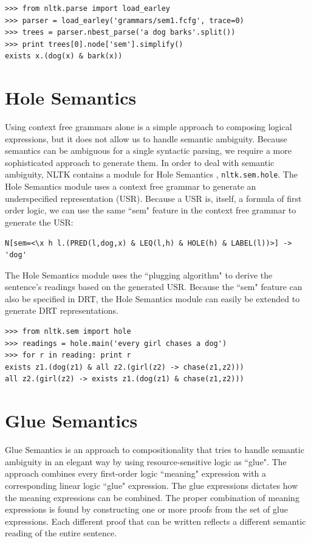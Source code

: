 \documentclass[11pt]{article}
\newcommand{\dhgcode}[1]{{\tt #1}}
\begin{document}
\begin{verbatim}
>>> from nltk.parse import load_earley
>>> parser = load_earley('grammars/sem1.fcfg', trace=0)
>>> trees = parser.nbest_parse('a dog barks'.split())
>>> print trees[0].node['sem'].simplify()
exists x.(dog(x) & bark(x))
\end{verbatim}


\section{Hole Semantics}
Using context free grammars alone is a simple approach to composing logical expressions, but it does not allow us to handle semantic ambiguity.  Because semantics can be ambiguous for a single syntactic parsing, we require a more sophisticated approach to generate them.  In order to deal with semantic ambiguity, NLTK contains a module for Hole Semantics \cite{BB}, \dhgcode{nltk.sem.hole}.  The Hole Semantics module uses a context free grammar to generate an underspecified representation (USR).  Because a USR is, itself, a formula of first order logic, we can use the same ``sem" feature in the context free grammar to generate the USR:

\small
\begin{verbatim}
N[sem=<\x h l.(PRED(l,dog,x) & LEQ(l,h) & HOLE(h) & LABEL(l))>] -> 'dog'
\end{verbatim}
\normalsize

The Hole Semantics module uses the ``plugging algorithm" to derive the sentence's readings based on the generated USR.  Because the ``sem" feature can also be specified in DRT, the Hole Semantics module can easily be extended to generate DRT representations.

\begin{verbatim}
>>> from nltk.sem import hole
>>> readings = hole.main('every girl chases a dog')
>>> for r in reading: print r
exists z1.(dog(z1) & all z2.(girl(z2) -> chase(z1,z2)))
all z2.(girl(z2) -> exists z1.(dog(z1) & chase(z1,z2)))
\end{verbatim}


\section{Glue Semantics}
Glue Semantics is an approach to compositionality that tries to handle semantic ambiguity in an elegant way by using resource-sensitive logic as ``glue".  The approach combines every first-order logic ``meaning" expression with a corresponding linear logic ``glue" expression.  The glue expressions dictates how the meaning expressions can be combined.  The proper combination of meaning expressions is found by constructing one or more proofs from the set of glue expressions.  Each different proof that can be written reflects a different semantic reading of the entire sentence.  
\end{document}
